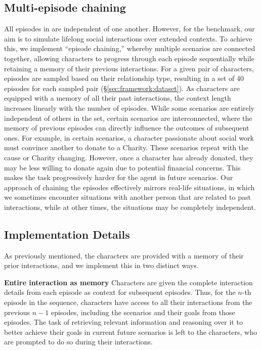 \subsection{Multi-episode chaining}
\label{sec:framework:chaining}
All episodes in \sotopia are independent of one another. However,
for the \lifelongsotopia benchmark, our aim is to simulate lifelong social interactions over extended contexts. To achieve this, we implement ``episode chaining,'' whereby multiple scenarios are connected together, allowing characters to progress through each episode sequentially while retaining a memory of their previous interactions. For a given pair of characters, episodes are sampled based on their relationship type, resulting in a set of 40 episodes for each sampled pair (\S \ref{sec:framework:dataset}). As characters are equipped with a memory of all their past interactions, the context length increases linearly with the number of episodes. While some scenarios are entirely independent of others in the set, certain scenarios are interconnected, where the memory of previous episodes can directly influence the outcomes of subsequent ones. For example, in certain scenarios, a character passionate about social work must convince another to donate to a Charity. These scenarios repeat with the cause or Charity changing. However, once a character has already donated, they may be less willing to donate again due to potential financial concerns. This makes the task progressively harder for the agent in future scenarios. Our approach of chaining the episodes effectively mirrors real-life situations, in which we sometimes encounter situations with another person that are related to past interactions, while at other times, the situations may be completely independent.

\subsection{Implementation Details}
\label{sec:framework:implementation}

As previously mentioned, the characters are provided with a memory of their prior interactions, and we implement this in two distinct ways.

\textbf{Entire interaction as memory} \quad Characters are given the complete interaction details from each episode as context for subsequent episodes. Thus, for the $n$-th episode in the sequence, characters have access to all their interactions from the previous $n-1$ episodes, including the scenarios and their goals from those episodes. The task of retrieving relevant information and reasoning over it to better achieve their goals in current future scenarios is left to the characters, who are prompted to do so during their interactions. 

